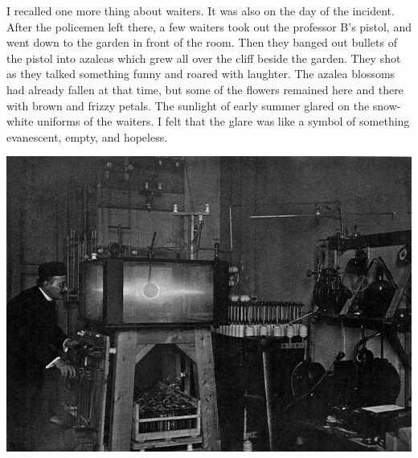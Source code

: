 \documentclass[11pt,a4j,twocolumn]{jarticle}
\begin{document}
I recalled one more thing about waiters.
It was also on the day of the incident.
After the policemen left there,
a few waiters took out the professor B's pistol,
and went down to the garden in front of the room.
Then they banged out bullets of the pistol into azaleas
which grew all over the cliff beside the garden.
They shot as they talked something funny and roared with laughter.
The azalea blossoms had already fallen at that time,
but some of the flowers remained here and there
with brown and frizzy petals.
The sunlight of early summer glared
on the snow-white uniforms of the waiters.
I felt that the glare was like a symbol of something evanescent, empty, and hopeless.

\vfill
\noindent
\centerline{\includegraphics[width=\columnwidth,bb=0 0 156 113]{terrella.jpg}}
\end{document}
